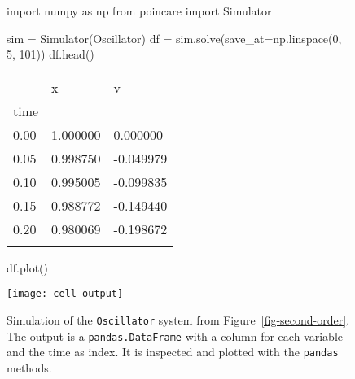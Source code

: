 \documentclass[namedate,numsec,webpdf,modern,large]{oup-authoring-template}
\theoremstyle{thmstyleone}%
\theoremstyle{thmstyletwo}%
\theoremstyle{thmstylethree}%
\newenvironment{CodeInput}{\begin{tcolorbox}[title=input,boxrule=0pt]}{\end{tcolorbox}}
\newenvironment{CodeOutput}{\begin{tcolorbox}[title=output,boxrule=0pt]}{\end{tcolorbox}}
\newcommand{\KeywordTok}[1]{\textcolor[rgb]{0.00,0.13,1.00}{#1}}
\newcommand{\ClassTok}[1]{\textcolor[rgb]{0.27,0.56,0.65}{#1}}
\newcommand{\OperatorTok}[1]{\textcolor[rgb]{0.00,0.00,0.00}{#1}}
\newcommand{\VariableTok}[1]{\textcolor[rgb]{0.00,0.06,0.50}{#1}}
\newcommand{\ValueTok}[1]{\textcolor[rgb]{0.13,0.57,0.41}{#1}}
\newcommand{\FunctionTok}[1]{\textcolor[rgb]{0.47,0.37,0.15}{#1}}
\begin{document}
\begin{figure}[t]
  \begin{minipage}[t]{\columnwidth}
    \begin{CodeInput}
\begin{Highlighting}[]
\KeywordTok{import} \ClassTok{numpy} \KeywordTok{as} \ClassTok{np}
\KeywordTok{from} \ClassTok{poincare} \KeywordTok{import} \ClassTok{Simulator}

\VariableTok{sim} \OperatorTok{=} \ClassTok{Simulator}\KeywordTok{(\ClassTok{Oscillator})}
\VariableTok{df} \OperatorTok{=} \VariableTok{sim}.\FunctionTok{solve}\KeywordTok{(}\VariableTok{save\_at}\OperatorTok{=}\ClassTok{np}.\FunctionTok{linspace}\KeywordTok{(}\ValueTok{0}, \ValueTok{5}, \ValueTok{101}\KeywordTok{))}
\VariableTok{df}.\FunctionTok{head}\KeywordTok{()}
\end{Highlighting}
    \end{CodeInput}
    \begin{CodeOutput}
        \begin{tabular}[]{@{}lll@{}}
            \toprule
            & x & v \\
            time & & \\
            \midrule
            0.00 & 1.000000 & 0.000000 \\
            0.05 & 0.998750 & -0.049979 \\
            0.10 & 0.995005 & -0.099835 \\
            0.15 & 0.988772 & -0.149440 \\
            0.20 & 0.980069 & -0.198672 \\
            \botrule
        \end{tabular}
    \end{CodeOutput}
  \end{minipage}%
  \hfill
  \begin{minipage}[t]{\columnwidth}
    \begin{CodeInput}
\begin{Highlighting}[]
\VariableTok{df}.\FunctionTok{plot}\KeywordTok{()}
\end{Highlighting}
    \end{CodeInput}
    \begin{CodeOutput}
      \texttt{[image: cell-output]}
    \end{CodeOutput}
  \end{minipage}%
  
  \caption{\label{fig-sim}Simulation of the \texttt{Oscillator} system
  from Figure~\ref{fig-second-order}. The output is a
  \texttt{pandas.DataFrame} with a column for each variable and the time
  as index. It is inspected and plotted with the \texttt{pandas} methods.}
\end{figure}
\end{document}
